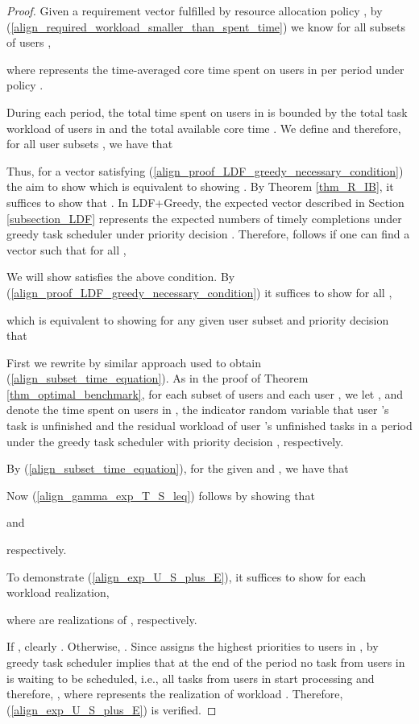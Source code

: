\documentclass[prodmode,acmtompecs]{acmsmall}
\newcommand{\myComments}[1]{}
\newif\iftompecs
\newcommand{\tompecsStart}{\iftompecs \myComments{TOMPECS version: }}
\begin{document}
\tompecsStart
\begin{proof}
Given a requirement vector  fulfilled by resource allocation policy , by (\ref{align_required_workload_smaller_than_spent_time}) we know for all subsets of users , 

where  represents the time-averaged core time spent on users in  per period under policy . 

During each period, the total time  spent on users in  is bounded by the total task workload  of users in  and the total available core time . 
We define  and therefore, for all user subsets , we have that


Thus, for a vector  satisfying (\ref{align_proof_LDF_greedy_necessary_condition}) the aim to show  which is equivalent to showing . By Theorem \ref{thm_R_IB}, it suffices to show that .
In LDF+Greedy, the expected vector  described in Section \ref{subsection_LDF} represents the expected numbers of timely completions under greedy task scheduler under priority decision .  
Therefore,  follows if one can find a vector  such that for all , 

We will show  satisfies the above condition. By (\ref{align_proof_LDF_greedy_necessary_condition}) it suffices to show for all ,

which is equivalent to showing for any given user subset  and priority decision  that


First we rewrite  by similar approach used to obtain (\ref{align_subset_time_equation}). 
As in the proof of Theorem \ref{thm_optimal_benchmark}, for each subset of users  and each user , 
we let ,  and  denote the time spent on users in , the indicator random variable that user 's task is unfinished and the residual workload of user 's unfinished tasks in a period under the greedy task scheduler with priority decision , respectively. 


By (\ref{align_subset_time_equation}), for the given  and , we have that


Now (\ref{align_gamma_exp_T_S_leq}) follows by showing that

and 

respectively. 

To demonstrate (\ref{align_exp_U_S_plus_E}), it suffices to show for each workload realization, 

where  are realizations of , respectively. 

If , clearly . Otherwise, . Since  assigns the highest priorities to users in , by greedy task scheduler  implies that at the end of the period no task from users in  is waiting to be scheduled, i.e., all tasks from users in  start processing and therefore, , where  represents the realization of workload . Therefore, (\ref{align_exp_U_S_plus_E}) is verified. 


\end{proof}
\end{document}
